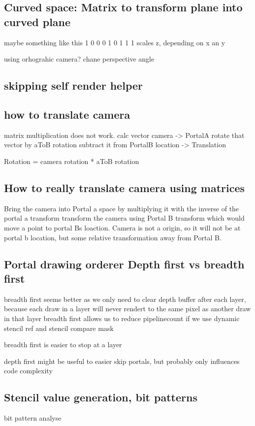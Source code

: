 \subsection{ Curved space: Matrix to transform plane into curved plane}
maybe something like this
1 0 0
0 1 0
1 1 1
scales z, depending on x an y

using orhograhic camera?
chane perspective angle


\subsection{skipping self render helper}
\subsection{how to translate camera}
matrix multiplication does not work.
calc vector camera -> PortalA
rotate that vector by aToB rotation
subtract it from PortalB location
-> Translation

Rotation = camera rotation * aToB rotation

\subsection{How to really translate camera using matrices}
Bring the camera into Portal a space by multiplying it with the inverse of the portal a transform
transform the camera using Portal B transform which would move a point to portal Bs loaction. Camera is not a origin, so it will not be at portal b location, but some relative transformation away from Portal B.




\subsection{Portal drawing orderer Depth first vs breadth first}

breadth first seems better as we only need to clear depth buffer after each layer, because
each draw in a layer will never rendert to the same pixel as another draw in that layer
breadth first allows us to reduce pipelinecount if we use dynamic stencil ref and stencil compare mask

breadth first is easier to stop at a layer

depth first might be useful to easier skip portals, but probably only influences code complexity

\subsection{Stencil value generation, bit patterns}
bit pattern analyse

